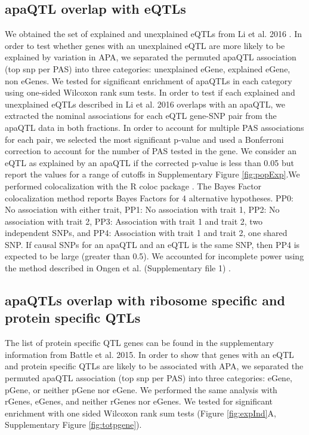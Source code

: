 \subsection{apaQTL overlap with eQTLs}\label{apaQTL-overlap-with-eQTLs}
We obtained the set of explained and unexplained eQTLs from Li et al. 2016 \citep{li_rna_2016}. In order to test whether genes with an unexplained eQTL are more likely to be explained by variation in APA, we separated the permuted apaQTL association (top snp per PAS) into three categories: unexplained eGene, explained eGene, non eGenes. We tested for significant enrichment of apaQTLs in each category using one-sided Wilcoxon rank sum tests. In order to test if each explained and unexplained eQTLs described in Li et al. 2016\citep{li_rna_2016} overlaps with an apaQTL, we extracted the nominal associations for each eQTL gene-SNP pair from the apaQTL data in both fractions. In order to account for multiple PAS associations for each pair, we selected the most significant p-value and used a Bonferroni correction to account for the number of PAS tested in the gene. We consider an eQTL as explained by an apaQTL if the corrected p-value is less than 0.05 but report the values for a range of cutoffs in Supplementary Figure \ref{fig:popExp}.We performed colocalization with the R coloc package \citep{wallace_statistical_2012}. The Bayes Factor colocalization method reports Bayes Factors for 4 alternative hypotheses. PP0: No association with either trait, PP1: No association with trait 1, PP2: No association with trait 2, PP3: Association with trait 1 and trait 2, two independent SNPs, and PP4: Association with trait 1 and trait 2, one shared SNP. If causal SNPs for an apaQTL and an eQTL is the same SNP, then PP4 is expected to be large (greater than 0.5). We accounted for incomplete power using the method described in Ongen et al. (Supplementary file 1) \citep{ongen_estimating_2017}.


\subsection{apaQTLs overlap with ribosome specific and protein specific QTLs}\label{apaQTLs-ribosome-specific-protein-specific-QTLs}
The list of protein specific QTL genes can be found in the supplementary information from Battle et al. 2015\citep{battle_genomic_2015}. In order to show that genes with an eQTL and protein specific QTLs are likely to be associated with APA, we separated the permuted apaQTL association (top snp per PAS) into three categories: eGene, pGene, or neither pGene nor eGene. We performed the same analysis with rGenes, eGenes, and neither rGenes nor eGenes. We tested for significant enrichment with one sided Wilcoxon rank sum tests (Figure \ref{fig:expInd}A, Supplementary Figure \ref{fig:totpgene}). 


